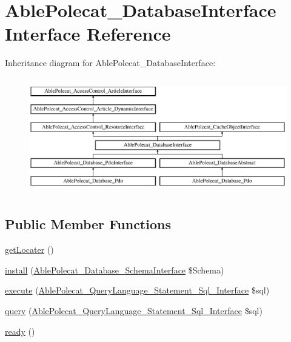 \hypertarget{interface_able_polecat___database_interface}{}\section{Able\+Polecat\+\_\+\+Database\+Interface Interface Reference}
\label{interface_able_polecat___database_interface}
Inheritance diagram for Able\+Polecat\+\_\+\+Database\+Interface\+:\begin{figure}[H]
\begin{center}
\leavevmode
\includegraphics[height=5.121951cm]{interface_able_polecat___database_interface}
\end{center}
\end{figure}
\subsection*{Public Member Functions}
\begin{DoxyCompactItemize}
\item 
\hyperlink{interface_able_polecat___database_interface_a66e49cc03d1511ec4c0290ffaa688079}{get\+Locater} ()
\item 
\hyperlink{interface_able_polecat___database_interface_aba618d13fc7fc2ddca23db57614cd14d}{install} (\hyperlink{interface_able_polecat___database___schema_interface}{Able\+Polecat\+\_\+\+Database\+\_\+\+Schema\+Interface} \$Schema)
\item 
\hyperlink{interface_able_polecat___database_interface_a2446b764608f23c472255a8e07076aff}{execute} (\hyperlink{interface_able_polecat___query_language___statement___sql___interface}{Able\+Polecat\+\_\+\+Query\+Language\+\_\+\+Statement\+\_\+\+Sql\+\_\+\+Interface} \$sql)
\item 
\hyperlink{interface_able_polecat___database_interface_a036b9fde55003e5c63dd6345b0f2a805}{query} (\hyperlink{interface_able_polecat___query_language___statement___sql___interface}{Able\+Polecat\+\_\+\+Query\+Language\+\_\+\+Statement\+\_\+\+Sql\+\_\+\+Interface} \$sql)
\item 
\hyperlink{interface_able_polecat___database_interface_a4196646b44144f7864b51e915f41fa84}{ready} ()
\end{DoxyCompactItemize}
